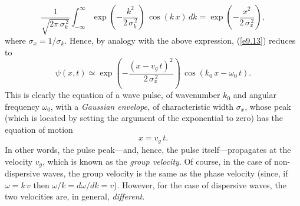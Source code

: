 \begin{equation}
 \frac{1}{\sqrt{2\pi\,\sigma_k^{\,2}}}\int_{-\infty}^\infty
\exp\left(-\frac{k^2}{2\,\sigma_k^{\,2}}\right)\,\cos(k\,x)\,dk=
\exp\left(-\frac{x^2}{2\,\sigma_x^{\,2}}\right),
\end{equation}
where $\sigma_x=1/\sigma_k$. Hence, by analogy with the above expression, (\ref{e9.13}) reduces to
\begin{equation}\label{e9.15}
\psi(x,t)\simeq \exp\left(-\frac{(x-v_g\,t)^2}{2\,\sigma_x^{\,2}}\right)\,\cos(k_0\,x-\omega_0\,t).
\end{equation}
This is clearly the equation of a wave pulse, of wavenumber $k_0$ and angular frequency $\omega_0$,
with a {\em Gaussian envelope,} of characteristic width $\sigma_x$, whose peak (which is located by setting the argument of the exponential to zero) has the
equation of motion
\begin{equation}
x = v_g\,t.
\end{equation}
In other words, the  pulse peak---and, hence, the pulse itself---propagates at
the velocity $v_g$, which is known as the {\em group velocity}. Of course, in the case of non-dispersive waves, the group
velocity is the same as the phase velocity (since, if $\omega=k\,v$ then $\omega/k=d\omega/dk = v$). However, for the case of dispersive waves, the two velocities are, in general,
{\em different}. 

